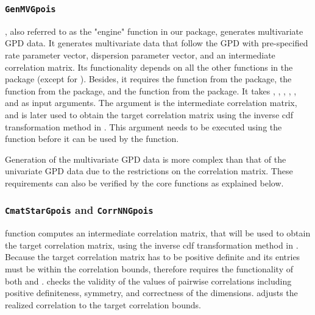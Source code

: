 \subsubsection{\texttt{GenMVGpois}}

\noindent {}, also referred to as the "engine" function in our package, generates multivariate GPD data. It generates multivariate data that follow the GPD with pre-specified rate parameter vector, dispersion parameter vector, and an intermediate correlation matrix. Its functionality depends on all the other functions in the package (except for ). Besides, it requires the  function from the  \citep{mvtnorm} package, the  function from the  \citep{corpcor} package, and the  function from the  \citep{matrix} package. It takes , , , , , and  as input arguments. The  argument is the intermediate correlation matrix, and is later used to obtain the target correlation matrix using the inverse cdf transformation method in . This argument needs to be executed using the  function before it can be used by the  function.

Generation of the multivariate GPD data is more complex than that of the univariate GPD data due to the restrictions on the correlation matrix. These requirements can also be verified by the core functions as explained below.

\subsubsection{\texttt{CmatStarGpois} and \texttt{CorrNNGpois}}

 function computes an intermediate correlation matrix, that will be used to obtain the target correlation matrix, using the inverse cdf transformation method in . Because the target correlation matrix has to be positive definite and its entries must be within the correlation bounds, therefore  requires the functionality of both  and .  checks the validity of the values of pairwise correlations including positive definiteness, symmetry, and correctness of the dimensions.  adjusts the realized correlation to the target correlation bounds.

